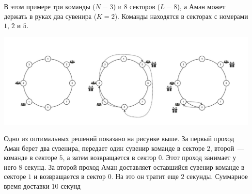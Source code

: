 В этом примере три команды ($N = 3$) и $8$ секторов ($L = 8$), а Аман может держать в руках
два сувенира ($K = 2$). Команды находятся в секторах с номерами $1$, $2$ и $5$.

\includegraphics[scale=0.8]{boxes1.png}

Одно из оптимальных решений показано на рисунке выше. За первый проход Аман берет два
сувенира, передает один сувенир команде в секторе $2$, второй~--- команде в секторе $5$, а затем
возвращается в сектор $0$. Этот проход занимает у него $8$ секунд. За второй проход Аман
доставляет оставшийся сувенир команде в секторе $1$ и возвращается в сектор $0$. На это он
тратит еще $2$ секунды. Суммарное время доставки $10$ секунд
